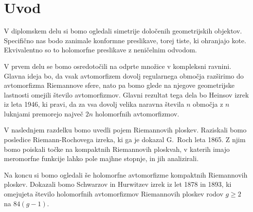 \section{Uvod}

V diplomskem delu si bomo ogledali simetrije določenih
geometrijskih objektov. Specifično nas bodo zanimale konformne
preslikave, torej tiste, ki ohranjajo kote. Ekvivalentno so to
holomorfne preslikave z neničelnim odvodom.

V prvem delu se bomo osredotočili na odprte množice v kompleksni
ravnini. Glavna ideja bo, da vsak avtomorfizem dovolj regularnega
območja razširimo do avtomorfizma Riemannove sfere, nato pa bomo
glede na njegove geometrijske lastnosti omejili število
avtomorfizmov. Glavni rezultat tega dela bo Heinsov izrek iz leta
1946, ki pravi, da za vsa dovolj velika naravna števila $n$ območja
z $n$ luknjami premorejo največ $2n$ holomorfnih avtomorfizmov.

V naslednjem razdelku bomo uvedli pojem Riemannovih ploskev.
Raziskali bomo posledice Riemann-Rochovega izreka, ki ga je dokazal
G.~Roch leta 1865. Z njim bomo poiskali točke na kompaktnih
Riemannovih ploskvah, v katerih imajo meromorfne funkcije lahko pole
majhne stopnje, in jih analizirali.

Na koncu si bomo ogledali še holomorfne avtomorfizme kompaktnih
Riemannovih ploskev. Dokazali bomo Schwarzov in Hurwitzev izrek iz
let 1878 in 1893, ki omejujeta število holomorfnih avtomorfizmov
Riemannovih ploskev rodov $g \geq 2$ na $84 (g-1)$.
